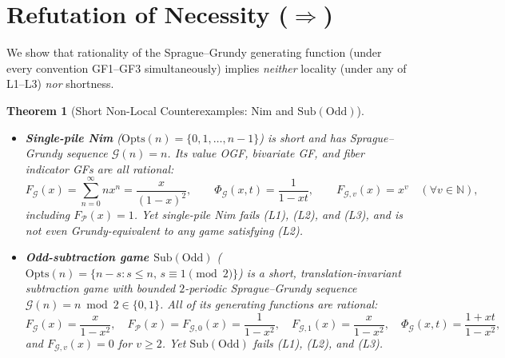 \documentclass[11pt]{article}
\newtheorem{theorem}{Theorem}[section]
\theoremstyle{definition}
\theoremstyle{remark}
\newcommand{\N}{\mathbb{N}}
\newcommand{\G}{\mathcal{G}}
\newcommand{\Ppos}{\mathcal{P}}
\newcommand{\Opts}{\mathrm{Opts}}
\newcommand{\Sub}{\mathrm{Sub}}
\begin{document}
\section{Refutation of Necessity (\texorpdfstring{$\Rightarrow$}{=>})}
\label{sec:necessity}

We show that rationality of the Sprague--Grundy generating function (under every convention GF1--GF3 simultaneously) implies \emph{neither} locality (under any of L1--L3) \emph{nor} shortness.

\begin{theorem}[Short Non-Local Counterexamples: Nim and $\Sub(\mathrm{Odd})$]
\label{thm:necessity-local}
\leavevmode
\begin{itemize}
  \item[\textup{(i)}] \textbf{Single-pile Nim} ($\Opts(n) = \{0,1,\dots,n-1\}$) is short and has Sprague--Grundy sequence $\G(n) = n$. Its value OGF, bivariate GF, and fiber indicator GFs are all rational:
  \[
    F_{\G}(x) = \sum_{n=0}^{\infty} n x^n = \frac{x}{(1-x)^2}, \qquad
    \Phi_{\G}(x,t) = \frac{1}{1-xt}, \qquad
    F_{\G,v}(x) = x^v \quad (\forall v \in \N),
  \]
  including $F_{\Ppos}(x) = 1$. Yet single-pile Nim fails \textup{(L1)}, \textup{(L2)}, and \textup{(L3)}, and is not even Grundy-equivalent to any game satisfying \textup{(L2)}.
  \item[\textup{(ii)}] \textbf{Odd-subtraction game $\Sub(\mathrm{Odd})$} ($\Opts(n) = \{n - s : s \le n,\, s \equiv 1 \pmod{2}\}$) is a short, translation-invariant subtraction game with bounded $2$-periodic Sprague--Grundy sequence $\G(n) = n \bmod 2 \in \{0,1\}$. All of its generating functions are rational:
  \[
    F_{\G}(x) = \frac{x}{1-x^2}, \quad
    F_{\Ppos}(x) = F_{\G,0}(x) = \frac{1}{1-x^2}, \quad
    F_{\G,1}(x) = \frac{x}{1-x^2}, \quad
    \Phi_{\G}(x,t) = \frac{1+xt}{1-x^2},
  \]
  and $F_{\G,v}(x) = 0$ for $v \ge 2$. Yet $\Sub(\mathrm{Odd})$ fails \textup{(L1)}, \textup{(L2)}, and \textup{(L3)}.
\end{itemize}
\end{theorem}
\end{document}
